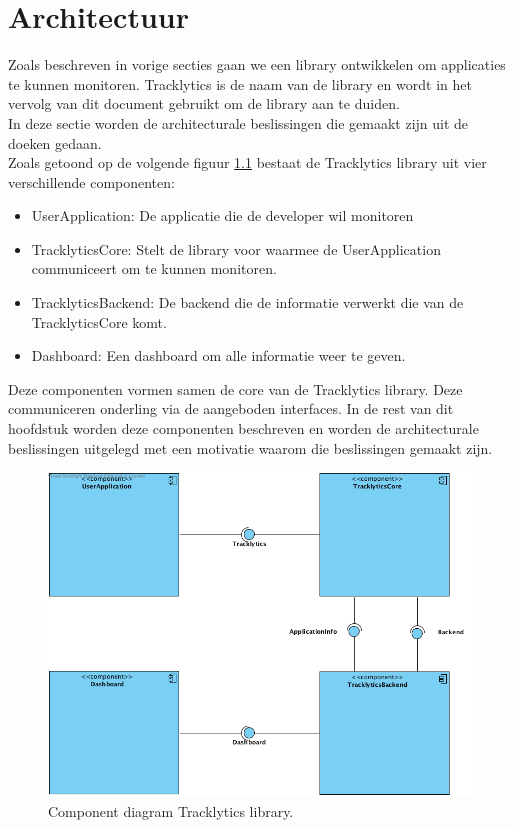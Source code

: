 \chapter{Architectuur}

Zoals beschreven in vorige secties gaan we een library ontwikkelen om applicaties te kunnen monitoren. Tracklytics is de naam van de library en wordt in het vervolg van dit document gebruikt om de library aan te duiden. \\
In deze sectie worden de architecturale beslissingen die gemaakt zijn uit de doeken gedaan.  \\


Zoals getoond op de volgende figuur \ref{fig:component} bestaat de Tracklytics library uit vier verschillende componenten:
\begin{itemize}
\item UserApplication: De applicatie die de developer wil monitoren
\item TracklyticsCore: Stelt de library voor waarmee de UserApplication communiceert om te kunnen monitoren.
\item TracklyticsBackend: De backend die de informatie verwerkt die van de TracklyticsCore komt.
\item Dashboard: Een dashboard om alle informatie weer te geven.
\end{itemize}

Deze componenten vormen samen de core van de Tracklytics library. Deze communiceren onderling via de aangeboden interfaces. In de rest van dit hoofdstuk worden deze componenten beschreven en worden de architecturale beslissingen uitgelegd met een motivatie waarom die beslissingen gemaakt zijn.

\begin{figure}[!h]
  \centering
  \includegraphics[scale=0.4]{Afbeeldingen/Architectuur/Component}
  \caption{Component diagram Tracklytics library.}
  \label{fig:component}
\end{figure}

